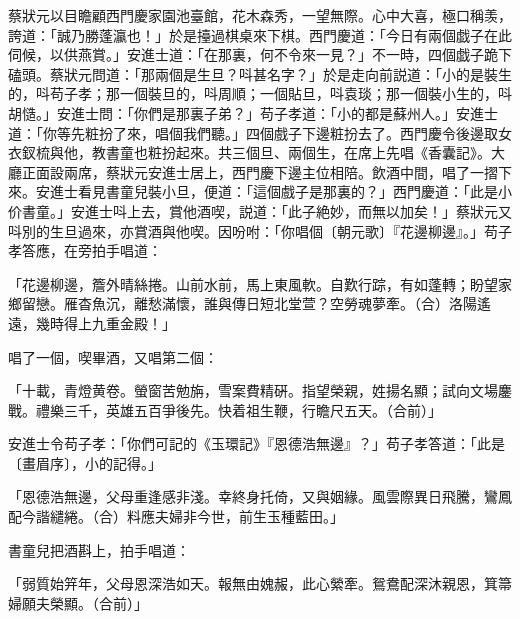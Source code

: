 蔡狀元以目瞻顧西門慶家園池臺館，花木森秀，一望無際。心中大喜，極口稱羡，誇道：「誠乃勝蓬瀛也！」於是擡過棋桌來下棋。西門慶道：「今日有兩個戯子在此伺候，以供燕賞。」安進士道：「在那裏，何不令來一見？」不一時，四個戯子跪下磕頭。蔡狀元問道：「那兩個是生旦？呌甚名字？」於是走向前説道：「小的是裝生的，呌苟子孝；那一個裝旦的，呌周順；一個貼旦，呌袁琰；那一個裝小生的，呌胡慥。」安進士問：「你們是那裏子弟？」苟子孝道：「小的都是蘇州人。」安進士道：「你等先粧扮了來，唱個我們聽。」四個戲子下邊粧扮去了。西門慶令後邊取女衣釵梳與他，教書童也粧扮起來。共三個旦、兩個生，在席上先唱《香囊記》。大廳正面設兩席，蔡狀元安進士居上，西門慶下邊主位相陪。飲酒中間，唱了一摺下來。安進士看見書童兒裝小旦，便道：「這個戲子是那裏的？」西門慶道：「此是小价書童。」安進士呌上去，賞他酒喫，説道：「此子絶妙，而無以加矣！」蔡狀元又呌別的生旦過來，亦賞酒與他喫。因吩咐：「你唱個〔朝元歌〕『花邊柳邊』。」苟子孝答應，在旁拍手唱道：

\begin{myquote}
「花邊柳邊，簷外晴絲捲。山前水前，馬上東風軟。自歎行踪，有如蓬轉；盼望家鄉留戀。雁杳魚沉，離愁滿懷，誰與傳日短北堂萱？空勞魂夢牽。{\marktext\small（合）}洛陽遙遠，幾時得上九重金殿！」
\end{myquote}

唱了一個，喫畢酒，又唱第二個：

\begin{myquote}
「十載，青燈黄卷。螢窗苦勉旃，雪案費精硏。指望榮親，姓揚名顯；試向文場鏖戰。禮樂三千，英雄五百爭後先。快着祖生鞭，行瞻尺五天。{\marktext\small（合前）}」
\end{myquote}

安進士令苟子孝：「你們可記的《玉環記》『恩德浩無邊』？」苟子孝答道：「此是〔畫眉序〕，小的記得。」

\begin{myquote}
「恩德浩無邊，父母重逢感非淺。幸終身托倚，又與姻緣。風雲際異日飛騰，鸞鳳配今諧繾綣。{\marktext\small（合）}料應夫婦非今世，前生玉種藍田。」
\end{myquote}

書童兒把酒斟上，拍手唱道：

\begin{myquote}
「弱質始笄年，父母恩深浩如天。報無由媿赧，此心縈牽。鴛鴦配深沐親恩，箕箒婦願夫榮顯。{\marktext\small（合前）}」
\end{myquote}

